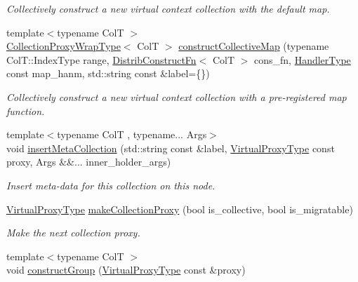 \begin{DoxyCompactItemize}
\begin{DoxyCompactList}\small\item\em Collectively construct a new virtual context collection with the default map. \end{DoxyCompactList}\item 
{\footnotesize template$<$typename ColT $>$ }\\\hyperlink{structvt_1_1vrt_1_1collection_1_1_collection_manager_a56458ed7f9bb22b631b9b3a745f42f94}{Collection\+Proxy\+Wrap\+Type}$<$ ColT $>$ \hyperlink{structvt_1_1vrt_1_1collection_1_1_collection_manager_a9b78bd325f19c36907e681e83bbd9398}{construct\+Collective\+Map} (typename Col\+T\+::\+Index\+Type range, \hyperlink{structvt_1_1vrt_1_1collection_1_1_collection_manager_a9ef5ab71e344fdee8525c3f18241c305}{Distrib\+Construct\+Fn}$<$ ColT $>$ cons\+\_\+fn, \hyperlink{namespacevt_af64846b57dfcaf104da3ef6967917573}{Handler\+Type} const map\+\_\+hanm, std\+::string const \&label=\{\})
\begin{DoxyCompactList}\small\item\em Collectively construct a new virtual context collection with a pre-\/registered map function. \end{DoxyCompactList}\item 
{\footnotesize template$<$typename ColT , typename... Args$>$ }\\void \hyperlink{structvt_1_1vrt_1_1collection_1_1_collection_manager_ac8c171d221c1c6eafe4efee35775e48b}{insert\+Meta\+Collection} (std\+::string const \&label, \hyperlink{namespacevt_a1b417dd5d684f045bb58a0ede70045ac}{Virtual\+Proxy\+Type} const proxy, Args \&\&... inner\+\_\+holder\+\_\+args)
\begin{DoxyCompactList}\small\item\em Insert meta-\/data for this collection on this node. \end{DoxyCompactList}\item 
\hyperlink{namespacevt_a1b417dd5d684f045bb58a0ede70045ac}{Virtual\+Proxy\+Type} \hyperlink{structvt_1_1vrt_1_1collection_1_1_collection_manager_ac0682938bc90285eb8c476d6898bf280}{make\+Collection\+Proxy} (bool is\+\_\+collective, bool is\+\_\+migratable)
\begin{DoxyCompactList}\small\item\em Make the next collection proxy. \end{DoxyCompactList}\item 
{\footnotesize template$<$typename ColT $>$ }\\void \hyperlink{structvt_1_1vrt_1_1collection_1_1_collection_manager_a526e4c6aca18333f508e34a24cabc712}{construct\+Group} (\hyperlink{namespacevt_a1b417dd5d684f045bb58a0ede70045ac}{Virtual\+Proxy\+Type} const \&proxy)

\end{DoxyCompactItemize}
